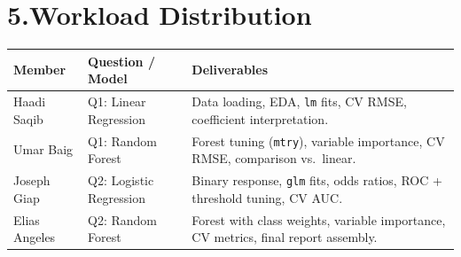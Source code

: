 \documentclass[10pt]{article}
\begin{document}
\section*{5.\quad Workload Distribution}

\footnotesize
\begin{tabularx}{\textwidth}{llX}
\toprule
\textbf{Member} & \textbf{Question / Model} & \textbf{Deliverables} \\
\midrule
Haadi Saqib & Q1: Linear Regression & Data loading, EDA, \texttt{lm} fits, CV RMSE, coefficient interpretation. \\
Umar Baig & Q1: Random Forest & Forest tuning (\texttt{mtry}), variable importance, CV RMSE, comparison vs.\ linear. \\
Joseph Giap & Q2: Logistic Regression & Binary response, \texttt{glm} fits, odds ratios, ROC + threshold tuning, CV AUC. \\
Elias Angeles & Q2: Random Forest & Forest with class weights, variable importance, CV metrics, final report assembly. \\
\bottomrule
\end{tabularx}
\normalsize
\end{document}
